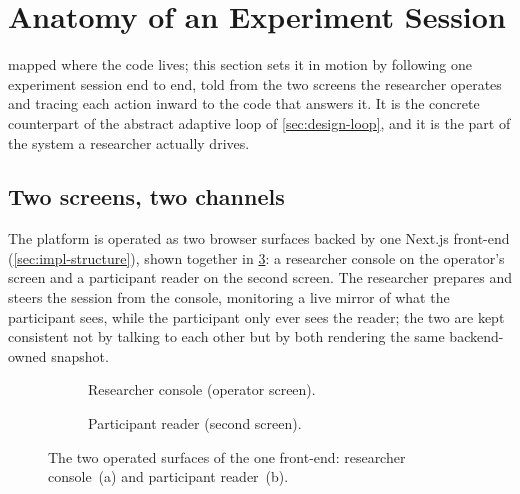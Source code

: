 \section{Anatomy of an Experiment Session}
\label{sec:impl-session}

 mapped where the code lives; this section sets it in motion by following one experiment session end to end, told from the two screens the researcher operates and tracing each action inward to the code that answers it.
It is the concrete counterpart of the abstract adaptive loop of \cref{sec:design-loop}, and it is the part of the system a researcher actually drives.

\subsection*{Two screens, two channels}

The platform is operated as two browser surfaces backed by one Next.js front-end (\cref{sec:impl-structure}), shown together in \cref{fig:impl-screens}: a researcher console on the operator's screen and a participant reader on the second screen.
The researcher prepares and steers the session from the console, monitoring a live mirror of what the participant sees, while the participant only ever sees the reader; the two are kept consistent not by talking to each other but by both rendering the same backend-owned snapshot.

\begin{figure}[htbp]
\centering
\begin{subfigure}{0.485\linewidth}
  \centering
  \caption{Researcher console (operator screen).}
  \label{fig:impl-screens-console}
\end{subfigure}\hfill
\begin{subfigure}{0.485\linewidth}
  \centering
  \caption{Participant reader (second screen).}
  \label{fig:impl-screens-reader}
\end{subfigure}
\caption[The two operated surfaces of the one front-end.]{The two operated surfaces of the one front-end: researcher console~(a) and participant reader~(b).}
\label{fig:impl-screens}
\end{figure}

